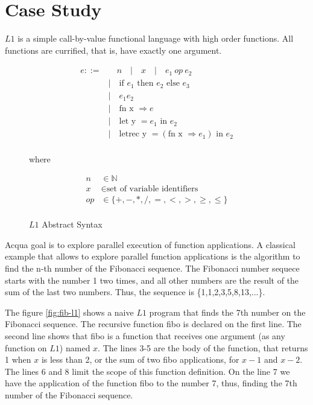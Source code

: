 \chapter{Case Study}

$L1$ is a simple call-by-value functional language with high order functions. All functions are currified, that is, have exactly one argument.

\begin{figure}
  \caption{$L1$ Abstract Syntax}
  \begin{openframe}
    \begin{align*}
      e ::= & \quad n \quad |\quad x \quad | \quad e_1 \: op \: e_2 \\
        & |\quad \text{if } e_1 \text{ then } e_2 \text{ else } e_3 \\
        & |\quad e_1 e_2 \\
        & |\quad \text{fn x } \Rightarrow e \\
        & |\quad \text{let y } = e_1 \text{ in } e_2 \\
        & |\quad \text{letrec y } = (\text{fn x } \Rightarrow e_1) \text{ in } e_2 \\
    \end{align*}

    where

    \begin{align*}
      n & \in \mathbb{N} \\
      x & \in \text{set of variable identifiers} \\
      op & \in \{+, -, *, /,  =, <, >, \geq, \leq \} \\
    \end{align*}
  \end{openframe}
\end{figure}

Acqua goal is to explore parallel execution of function applications. A classical example that allows to explore parallel function applications is the algorithm to find the n-th number of the Fibonacci sequence. The Fibonacci number sequece starts with the number 1 two times, and all other numbers are the result of the sum of the last two numbers. Thus, the sequence is \{1,1,2,3,5,8,13,...\}.

The figure \ref{fig:fib-l1} shows a naive $L1$ program that finds the 7th number on the Fibonacci sequence. The recursive function fibo is declared on the first line. The second line shows that fibo is a function that receives one argument (as any function on $L1$) named $x$. The lines 3-5 are the body of the function, that returns 1 when $x$ is less than 2, or the sum of two fibo applications, for $x-1$ and $x-2$. The lines 6 and 8 limit the scope of this function definition. On the line 7 we have the application of the function fibo to the number 7, thus, finding the 7th number of the Fibonacci sequence.

